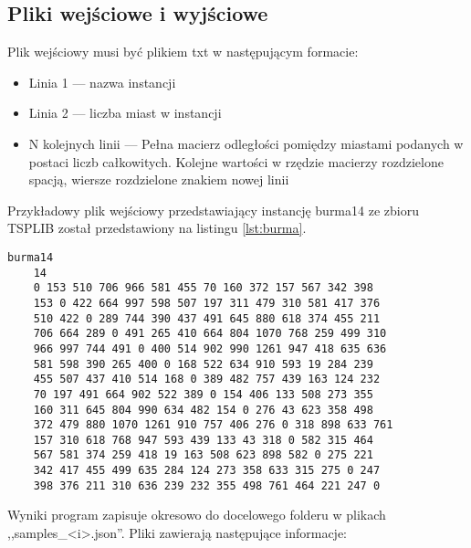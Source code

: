 \subsection{Pliki wejściowe i wyjściowe}

Plik wejściowy musi być plikiem txt w następującym formacie:
\begin{itemize}
    \item Linia 1 --- nazwa instancji
    \item Linia 2 --- liczba miast w instancji
    \item N kolejnych linii --- Pełna macierz odległości pomiędzy miastami podanych w postaci liczb całkowitych.
          Kolejne wartości w rzędzie macierzy rozdzielone spacją, wiersze rozdzielone znakiem nowej linii
\end{itemize}


Przykładowy plik wejściowy przedstawiający instancję burma14 ze zbioru TSPLIB został przedstawiony na listingu
\ref{lst:burma}.

\begin{lstlisting}[caption={Instancja burma14 w formacie akceptowanym przez program}, label=lst:burma]
    burma14
    14
    0 153 510 706 966 581 455 70 160 372 157 567 342 398 
    153 0 422 664 997 598 507 197 311 479 310 581 417 376 
    510 422 0 289 744 390 437 491 645 880 618 374 455 211 
    706 664 289 0 491 265 410 664 804 1070 768 259 499 310 
    966 997 744 491 0 400 514 902 990 1261 947 418 635 636 
    581 598 390 265 400 0 168 522 634 910 593 19 284 239 
    455 507 437 410 514 168 0 389 482 757 439 163 124 232 
    70 197 491 664 902 522 389 0 154 406 133 508 273 355 
    160 311 645 804 990 634 482 154 0 276 43 623 358 498 
    372 479 880 1070 1261 910 757 406 276 0 318 898 633 761 
    157 310 618 768 947 593 439 133 43 318 0 582 315 464 
    567 581 374 259 418 19 163 508 623 898 582 0 275 221 
    342 417 455 499 635 284 124 273 358 633 315 275 0 247 
    398 376 211 310 636 239 232 355 498 761 464 221 247 0     
\end{lstlisting}

Wyniki program zapisuje okresowo do docelowego folderu w plikach ,,samples\_<i>.json''.
Pliki zawierają następujące informacje:

